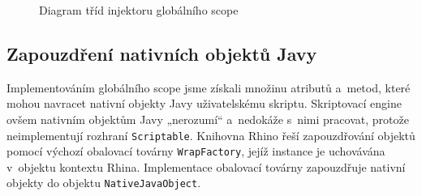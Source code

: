 \begin{figure}[H]
  \begin{center}
    \caption{Diagram tříd injektoru globálního scope}
    \label{Figure.ClassObjectsInjector}
  \end{center}
\end{figure}

\vspace{-3em}

\subsection{Zapouzdření nativních objektů Javy}
\label{Chapter.Implementation.NativeJavaWrappers}

Implementováním globálního scope  jsme získali množinu atributů a~metod, které mohou navracet nativní objekty Javy uživatelskému skriptu. Skriptovací engine ovšem nativním objektům Javy „nerozumí“ a~nedokáže s~nimi pracovat, protože neimplementují rozhraní \texttt{Scriptable}. Knihovna Rhino řeší zapouzdřování objektů pomocí výchozí obalovací továrny \texttt{WrapFactory}, jejíž instance je uchovávána v~objektu kontextu Rhina. Implementace obalovací továrny zapouzdřuje nativní objekty do objektu \texttt{NativeJavaObject}.

